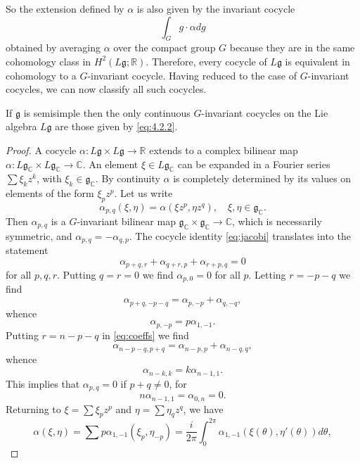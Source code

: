 \documentclass[12pt]{article}
\begin{document}
So the extension defined by $\alpha$ is also given by the invariant cocycle
\[
    \int_G g\cdot\alpha dg
\]
obtained by averaging $\alpha$ over the compact group $G$ because they are in the same cohomology class in $H^2(L\mathfrak{g};\mathbb{R})$. Therefore, every cocycle of $L\mathfrak{g}$ is equivalent in cohomology to a $G$-invariant cocycle. Having reduced to the case of $G$-invariant cocycles, we can now classify all such cocycles.

\begin{proposition}\label{prop:invariant_cocycles}
    If $\mathfrak{g}$ is semisimple then the only continuous $G$-invariant
    cocycles on the Lie algebra $L\mathfrak{g}$ are those given by
    \eqref{eq:4.2.2}.
\end{proposition}

\begin{proof}
    A cocycle $\alpha : L\mathfrak{g} \times L\mathfrak{g} \to \mathbb{R}$
    extends to a complex bilinear map
    $\alpha : L\mathfrak{g}_{\mathbb{C}} \times L\mathfrak{g}_{\mathbb{C}} \to \mathbb{C}$.
    An element $\xi \in L\mathfrak{g}_{\mathbb{C}}$ can be expanded in a Fourier series
    $\sum \xi_k z^k$, with $\xi_k \in \mathfrak{g}_{\mathbb{C}}$. By continuity $\alpha$ is
    completely determined by its values on elements of the form $\xi_p z^p$.
    Let us write
    \[
        \alpha_{p,q}(\xi,\eta) = \alpha(\xi z^p, \eta z^q), \quad \xi,\eta \in \mathfrak{g}_{\mathbb{C}}.
    \]
    Then $\alpha_{p,q}$ is a $G$-invariant bilinear map
    $\mathfrak{g}_{\mathbb{C}} \times \mathfrak{g}_{\mathbb{C}} \to \mathbb{C}$, which is necessarily symmetric, and
    $\alpha_{p,q} = -\alpha_{q,p}$. The cocycle identity \eqref{eq:jacobi} translates into the statement
    \begin{equation} \label{eq:coeffs}
        \alpha_{p+q,r} + \alpha_{q+r,p} + \alpha_{r+p,q} = 0
    \end{equation}
    for all $p,q,r$. Putting $q=r=0$ we find $\alpha_{p,0}=0$ for all $p$. Letting $r = -p-q$ we find
    \[
        \alpha_{p+q,-p-q} = \alpha_{p,-p} + \alpha_{q,-q},
    \]
    whence
    \[
        \alpha_{p,-p} = p  \alpha_{1,-1}.
    \]
    Putting $r = n-p-q$ in \ref{eq:coeffs} we find
    \[
        \alpha_{n-p-q,p+q} = \alpha_{n-p,p} + \alpha_{n-q,q},
    \]
    whence
    \[
        \alpha_{n-k,k} = k \alpha_{n-1,1}.
    \]
    This implies that $\alpha_{p,q} = 0$ if $p+q \neq 0$, for
    \[
        n\alpha_{n-1,1} = \alpha_{0,n} = 0.
    \]
    Returning to $\xi = \sum \xi_p z^p$ and $\eta = \sum \eta_q z^q$, we have
    \[
        \alpha(\xi,\eta) = \sum p  \alpha_{1,-1}(\xi_p, \eta_{-p})
        = \frac{i}{2\pi} \int_0^{2\pi} \alpha_{1,-1}(\xi(\theta), \eta'(\theta)) d\theta,
    \]
\end{proof}
\end{document}
